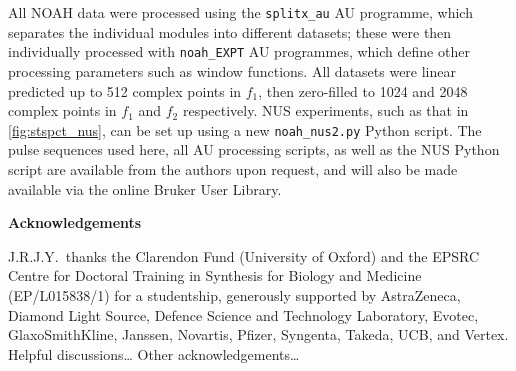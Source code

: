 \documentclass[11pt]{article}
\newcommand*{\hl}[1]{\textcolor{WildStrawberry}{#1}}
\begin{document}
All NOAH data were processed using the \texttt{splitx\_au} AU programme, which separates the individual modules into different datasets; these were then individually processed with \texttt{noah\_EXPT} AU programmes, which define other processing parameters such as window functions.
All datasets were linear predicted up to 512 complex points in $f_1$, then zero-filled to 1024 and 2048 complex points in $f_1$ and $f_2$ respectively.
NUS experiments, such as that in \cref{fig:stspct_nus}, can be set up using a new \texttt{noah\_nus2.py} Python script.
The pulse sequences used here, all AU processing scripts, as well as the NUS Python script are available from the authors upon request, and will also be made available via the online Bruker User Library.



\textbf{\Large Acknowledgements}

J.R.J.Y.\ thanks the Clarendon Fund (University of Oxford) and the EPSRC Centre for Doctoral Training in Synthesis for Biology and Medicine (EP/L015838/1) for a studentship, generously supported by AstraZeneca, Diamond Light Source, Defence Science and Technology Laboratory, Evotec, GlaxoSmithKline, Janssen, Novartis, Pfizer, Syngenta, Takeda, UCB, and Vertex.
\hl{Helpful discussions\ldots}
\hl{Other acknowledgements\ldots}


\printbibliography

\end{document}
